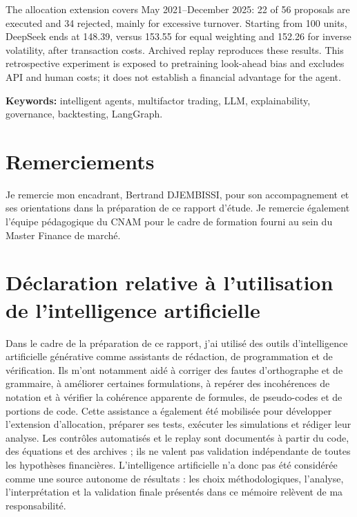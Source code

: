 \documentclass[12pt,letterpaper]{report}
\begin{document}
The allocation extension covers May 2021--December 2025: 22 of 56 proposals are executed and 34 rejected, mainly for excessive turnover. Starting from 100 units, DeepSeek ends at 148.39, versus 153.55 for equal weighting and 152.26 for inverse volatility, after transaction costs. Archived replay reproduces these results. This retrospective experiment is exposed to pretraining look-ahead bias and excludes API and human costs; it does not establish a financial advantage for the agent.

\vspace{0.4cm}
\noindent \textbf{Keywords:} intelligent agents, multifactor trading, LLM, explainability, governance, backtesting, LangGraph.

\clearpage
\chapter*{Remerciements}
Je remercie mon encadrant, Bertrand DJEMBISSI, pour son accompagnement et ses orientations dans la préparation de ce rapport d'étude. Je remercie également l'équipe pédagogique du CNAM pour le cadre de formation fourni au sein du Master Finance de marché.

\clearpage
\chapter*{Déclaration relative à l'utilisation de l'intelligence artificielle}
Dans le cadre de la préparation de ce rapport, j'ai utilisé des outils d'intelligence artificielle générative comme assistants de rédaction, de programmation et de vérification. Ils m'ont notamment aidé à corriger des fautes d'orthographe et de grammaire, à améliorer certaines formulations, à repérer des incohérences de notation et à vérifier la cohérence apparente de formules, de pseudo-codes et de portions de code. Cette assistance a également été mobilisée pour développer l'extension d'allocation, préparer ses tests, exécuter les simulations et rédiger leur analyse. Les contrôles automatisés et le replay sont documentés à partir du code, des équations et des archives ; ils ne valent pas validation indépendante de toutes les hypothèses financières. L'intelligence artificielle n'a donc pas été considérée comme une source autonome de résultats : les choix méthodologiques, l'analyse, l'interprétation et la validation finale présentés dans ce mémoire relèvent de ma responsabilité.
\end{document}
